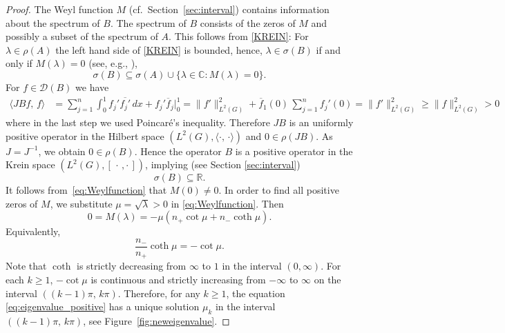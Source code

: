 \documentclass{article}
\numberwithin{equation}{section}
\theoremstyle{definition}
\newcommand{\kip}{[\,\cdot\, , \cdot\,]}
\newcommand{\R}{\mathbb{R}}
\newcommand{\C}{\mathbb{C}}
\newcommand{\mD}{\mathcal{D}}
\newcommand{\scalar}[2]{\langle#1,\, #2\rangle}
\newcommand{\AK}{A}
\newcommand{\AKone}{B}
\newcommand{\MK}{M}
\begin{document}
\begin{proof}
   The Weyl function $M$ (cf.\ Section~\ref{sec:interval}) contains information about the spectrum of $\AKone$.
   The spectrum of $\AKone$ consists of the zeros of $M$ and possibly a subset of the spectrum of $\AK$.
    This follows from \eqref{KREIN}: For $\lambda \in \rho(A)$ the left hand side of \eqref{KREIN} is bounded, hence, $\lambda \in \sigma(B)$ if and only if $M(\lambda)=0$ 
   (see, e.g., \cite[Theorem 2.1]{D95}), 
   \begin{equation}
      \sigma(\AKone)\subseteq \sigma(\AK) \cup \{ \lambda\in\C : \MK(\lambda) = 0 \}.
   \end{equation}
   For $f\in\mD(B)$ we have
   \begin{align}
   \label{Bananenwurst}
      \scalar{J\AKone f}{f}
      & = \sum_{j=1}^n \int_0^1 f_j' \overline{f_j'}\, dx + f_j' \overline f_j\Big|_0^1 = \| f' \|_{L^2(G)}^2 +  \overline f_1(0)\, \sum_{j=1}^n f_j'(0) = \| f' \|_{L^2(G)}^2 
      \ge 
      \| f \|_{L^2(G)}^2 
      >0
   \end{align}
   where in the last step we used Poincar\'e's inequality.
   Therefore $JB$ is an uniformly positive operator in the Hilbert space $(L^2(G),\scalar{\cdot}{\cdot})$ and $0\in\rho(JB)$. As $J=J^{-1}$, we obtain  $0\in\rho(B)$.
   Hence the operator $B$ is a positive operator in the Krein space $(L^2(G), \kip)$, implying 
   (see Section \ref{sec:interval})
   \begin{equation*}
   	\sigma(\AKone)\subseteq \R.
   \end{equation*}
   It follows from~\eqref{eq:Weylfunction} that $\MK(0)\neq0$. In order to find all positive zeros of $\MK$, we substitute $\mu = \sqrt{\lambda} > 0$ in \eqref{eq:Weylfunction}. Then
   \begin{equation*}
   	0 = \MK(\lambda) = -\mu (n_+ \cot\mu + n_- \coth \mu).
   \end{equation*}
   Equivalently,
   \begin{equation}
   \label{eq:eigenvalue_positive}
       \frac{n_-}{n_+} \coth \mu =	- \cot\mu.
   \end{equation}
   Note that $\coth$ is strictly decreasing from $\infty$ to $1$ in the interval $(0, \infty)$. 
   For each $k\ge 1$, $-\cot\mu$ is continuous and strictly increasing from $-\infty$ to $\infty$ on the interval $( (k-1)\pi,\, k\pi)$. 
   Therefore, for any $k\ge 1$, the equation \eqref{eq:eigenvalue_positive} has a unique solution $\mu_k$ in the interval $((k-1)\pi,\, k\pi)$, see Figure~\ref{fig:neweigenvalue}.


\end{proof}
\end{document}
